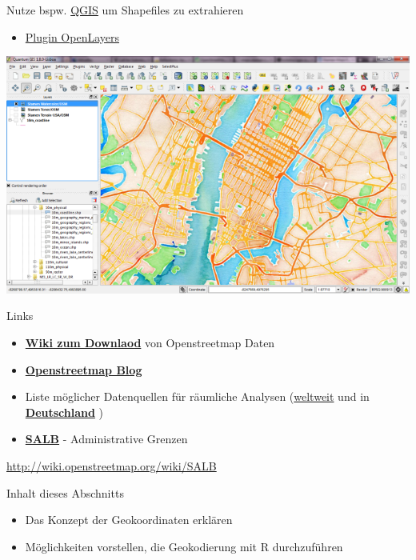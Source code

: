 \documentclass[ignorenonframetext,]{beamer}
\providecommand{\tightlist}{%
  \setlength{\itemsep}{0pt}\setlength{\parskip}{0pt}}
\begin{document}
\begin{frame}{Nutze bspw. \href{http://www.qgis.org/de/site/}{QGIS} um
Shapefiles zu extrahieren}

\begin{itemize}
\tightlist
\item
  \href{http://www.qgistutorials.com/de/docs/downloading_osm_data.html}{Plugin
  OpenLayers}
\end{itemize}

\includegraphics{figure/stamen_watercolor1.png}

\end{frame}

\begin{frame}{Links}

\begin{itemize}
\item
  \href{http://wiki.openstreetmap.org/wiki/Downloading_data}{\textbf{Wiki
  zum Downlaod}} von Openstreetmap Daten
\item
  \href{http://blog.openstreetmap.de/}{\textbf{Openstreetmap Blog}}
\item
  Liste möglicher Datenquellen für räumliche Analysen
  (\href{http://wiki.openstreetmap.org/wiki/Potential_Datasources}{weltweit}
  und in
  \href{http://wiki.openstreetmap.org/wiki/DE:Potential_Datasources}{\textbf{Deutschland}}
  )
\item
  \href{http://wiki.openstreetmap.org/wiki/SALB}{\textbf{SALB}} -
  Administrative Grenzen
\end{itemize}

\url{http://wiki.openstreetmap.org/wiki/SALB}

\end{frame}

\begin{frame}{Inhalt dieses Abschnitts}

\begin{itemize}
\tightlist
\item
  Das Konzept der Geokoordinaten erklären
\item
  Möglichkeiten vorstellen, die Geokodierung mit R durchzuführen
\end{itemize}

\end{frame}
\end{document}

